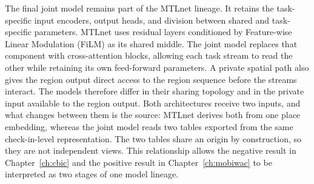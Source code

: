 The final joint model remains part of the MTLnet lineage. It retains the task-specific
input encoders, output heads, and division between shared and task-specific parameters.
MTLnet uses residual layers conditioned by Feature-wise Linear Modulation (FiLM) as its
shared middle. The joint model
replaces that component with cross-attention blocks, allowing each task stream to
read the other while retaining its own feed-forward parameters. A private spatial
path also gives the region output direct access to the region sequence before the
streams interact. The models therefore differ in their sharing topology and in the
private input available to the region output. Both architectures receive two inputs,
and what changes between them is the source: MTLnet derives both from one place
embedding, whereas the joint model reads two tables exported from the same check-in-level
representation. The two tables share an origin by construction, so they are not
independent views. This relationship allows the negative
result in Chapter~\ref{ch:cbic} and the positive result in
Chapter~\ref{ch:mobiwac} to be interpreted as two stages of one model lineage.
